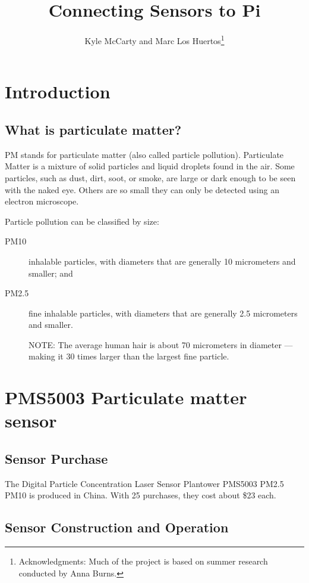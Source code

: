\documentclass{article}
\title{Connecting Sensors to Pi}
\author{Kyle McCarty and Marc Los Huertos\footnote{Acknowledgments: Much of the project is based on summer research conducted by Anna Burns.}}
\begin{document}
\maketitle
\tableofcontents

\section{Introduction}


\subsection{What is particulate matter?}

PM stands for particulate matter (also called particle pollution). Particulate Matter is a mixture of solid particles and liquid droplets found in the air. Some particles, such as dust, dirt, soot, or smoke, are large or dark enough to be seen with the naked eye. Others are so small they can only be detected using an electron microscope.

Particle pollution can be classified by size:

\begin{description}
  \item[PM10] inhalable particles, with diameters that are generally 10 micrometers and smaller; and

  \item[PM2.5] fine inhalable particles, with diameters that are generally 2.5 micrometers and smaller.
  
NOTE: The average human hair is about 70 micrometers in diameter --- making it 30 times larger than the largest fine particle.

\end{description}

\section{PMS5003 Particulate matter sensor}

\subsection{Sensor Purchase}
The Digital Particle Concentration Laser Sensor Plantower PMS5003 PM2.5 PM10 is produced in China. With 25 purchases, they cost about \$23 each.

\subsection{Sensor Construction and Operation}
\end{document}
